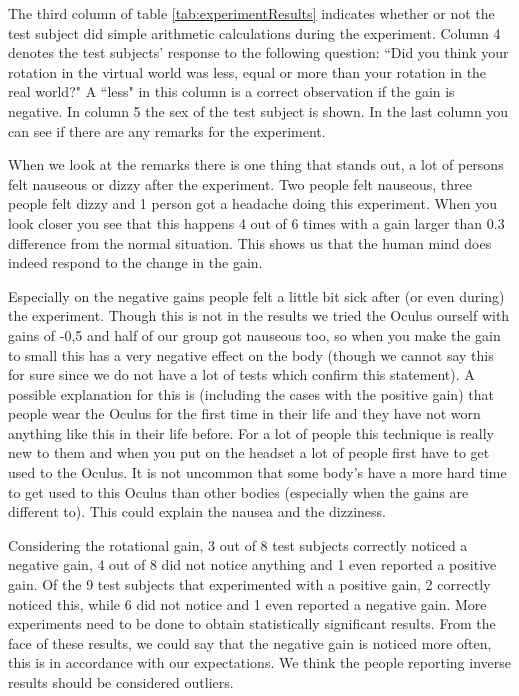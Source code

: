 The third column of table \ref{tab:experimentResults} indicates whether or not the test subject did simple arithmetic calculations during the experiment. 
Column 4 denotes the test subjects'  response to the following question: ``Did you think your rotation in the virtual world was less, equal or more than your rotation in the real world?"
A ``less" in this column is a correct observation if the gain is negative. 
In column 5 the sex of the test subject is shown.%
In the last column you can see if there are any remarks for the experiment.

When we look at the remarks there is one thing that stands out, a lot of persons felt nauseous or dizzy after the experiment. 
Two people felt nauseous, three people felt dizzy and 1 person got a headache doing this experiment. 
When you look closer you see that this happens 4 out of 6 times with a gain larger than 0.3 difference from the normal situation. 
This shows us that the human mind does indeed respond to the change in the gain. 

Especially on the negative gains people felt a little bit sick after (or even during) the experiment. 
Though this is not in the results we tried the Oculus ourself with gains of -0,5 and half of our group got nauseous too, so when you make the gain to small this has a very negative effect on the body (though we cannot say this for sure since we do not have a lot of tests which confirm this statement). 
A possible explanation for this is (including the cases with the positive gain) that people wear the Oculus for the first time in their life and they have not worn anything like this in their life before. 
For a lot of people this technique is really new to them and when you put on the headset a lot of people first have to get used to the Oculus. 
It is not uncommon that some body's have a more hard time to get used to this Oculus than other bodies (especially when the gains are different to). 
This could explain the nausea and the dizziness.

Considering the rotational gain, 3 out of 8 test subjects correctly noticed a negative gain, 4 out of 8 did not notice anything and 1 even reported a positive gain.
Of the 9 test subjects that experimented with a positive gain, 2 correctly noticed this, while 6 did not notice and 1 even reported a negative gain.
More experiments need to be done to obtain statistically significant results.
From the face of these results, we could say that the negative gain is noticed more often, this is in accordance with our expectations.
We think the people reporting inverse results should be considered outliers.


